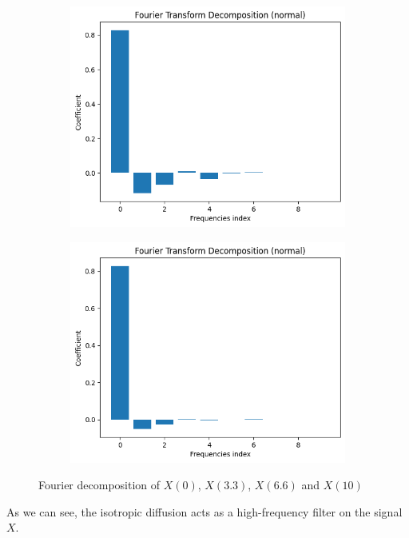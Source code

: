 \documentclass[12pt]{article}
\begin{document}
\begin{figure}[h!]
\begin{subfigure}{.5\textwidth}
  \includegraphics[width=1\linewidth]{images/ft-t3.png}
\end{subfigure}%
\begin{subfigure}{.5\textwidth}
  \centering
  \includegraphics[width=1\linewidth]{images/ft-t4.png}
\end{subfigure}%
\caption{Fourier decomposition of $X(0)$, $X(3.3)$, $X(6.6)$ and $X(10)$}
\end{figure}

\newpage
As we can see, the isotropic diffusion acts as a high-frequency filter on the signal $X$.\\
\end{document}
